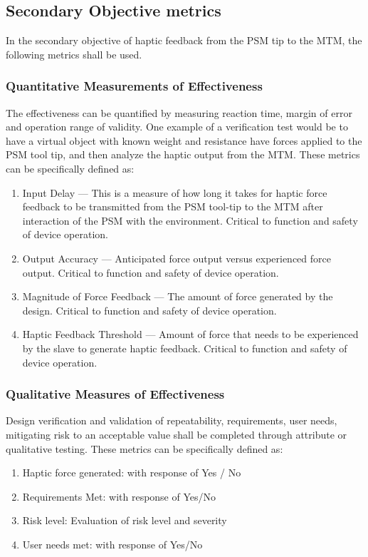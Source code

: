\documentclass[10pt,journal,compsoc]{IEEEtran}
\begin{document}
\subsection{Secondary Objective metrics}
In the secondary objective of haptic feedback from the PSM tip to the MTM, the following metrics shall be used. 

\subsubsection{Quantitative Measurements of Effectiveness}
The effectiveness can be quantified by measuring reaction time, margin of error and operation range of validity. One example of a verification test would be to have a virtual object with known weight and resistance have forces applied to the PSM tool tip, and then analyze the haptic output from the MTM.
These metrics can be specifically defined as:
			\begin{enumerate}
				\item Input Delay --- This is a measure of how long it takes for haptic force feedback to be transmitted from the PSM tool-tip to the MTM after interaction of the PSM with the environment. Critical to function and safety of device operation.
				\item Output Accuracy --- Anticipated force output versus experienced force output. Critical to function and safety of device operation.
				\item Magnitude of Force Feedback --- The amount of force generated by the design. Critical to function and safety of device operation.
				\item Haptic Feedback Threshold --- Amount of force that needs to be experienced by the slave to generate haptic feedback. Critical to function and safety of device operation.
			\end{enumerate}

\subsubsection{Qualitative Measures of Effectiveness}
Design verification and validation of repeatability, requirements, user needs, mitigating risk to an acceptable value shall be completed through attribute or qualitative testing. 
These metrics can be specifically defined as:
			\begin{enumerate}
				\item Haptic force generated: with response of Yes / No	
				\item Requirements Met: with response of Yes/No
				\item Risk level: Evaluation of risk level and severity
				\item User needs met: with response of Yes/No
			\end{enumerate}
\end{document}
